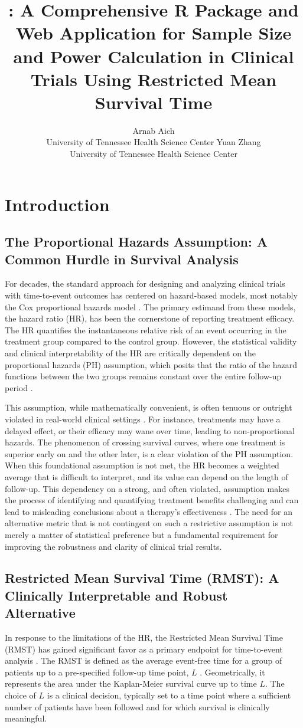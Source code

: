 \documentclass[article]{jss}
\title{\pkg{RMSTpowerBoost}: A Comprehensive R Package and Web Application for Sample Size and Power Calculation in Clinical Trials Using Restricted Mean Survival Time}
\author{Arnab Aich\\University of Tennessee Health Science Center
  \And Yuan Zhang\\University of Tennessee Health Science Center}
\begin{document}
\section{Introduction}

\subsection{The Proportional Hazards Assumption: A Common Hurdle in Survival Analysis}
For decades, the standard approach for designing and analyzing clinical trials with time-to-event outcomes has centered on hazard-based models, most notably the Cox proportional hazards model \cite{[1]}. The primary estimand from these models, the hazard ratio (HR), has been the cornerstone of reporting treatment efficacy. The HR quantifies the instantaneous relative risk of an event occurring in the treatment group compared to the control group. However, the statistical validity and clinical interpretability of the HR are critically dependent on the proportional hazards (PH) assumption, which posits that the ratio of the hazard functions between the two groups remains constant over the entire follow-up period \cite{[1]}.

This assumption, while mathematically convenient, is often tenuous or outright violated in real-world clinical settings \cite{[1]}. For instance, treatments may have a delayed effect, or their efficacy may wane over time, leading to non-proportional hazards. The phenomenon of crossing survival curves, where one treatment is superior early on and the other later, is a clear violation of the PH assumption. When this foundational assumption is not met, the HR becomes a weighted average that is difficult to interpret, and its value can depend on the length of follow-up. This dependency on a strong, and often violated, assumption makes the process of identifying and quantifying treatment benefits challenging and can lead to misleading conclusions about a therapy's effectiveness \cite{[1]}. The need for an alternative metric that is not contingent on such a restrictive assumption is not merely a matter of statistical preference but a fundamental requirement for improving the robustness and clarity of clinical trial results.

\subsection{Restricted Mean Survival Time (RMST): A Clinically Interpretable and Robust Alternative}
In response to the limitations of the HR, the Restricted Mean Survival Time (RMST) has gained significant favor as a primary endpoint for time-to-event analysis \cite{royston2013, uno2014}. The RMST is defined as the average event-free time for a group of patients up to a pre-specified follow-up time point, $L$ \cite{[1]}. Geometrically, it represents the area under the Kaplan-Meier survival curve up to time $L$. The choice of $L$ is a clinical decision, typically set to a time point where a sufficient number of patients have been followed and for which survival is clinically meaningful.
\end{document}
